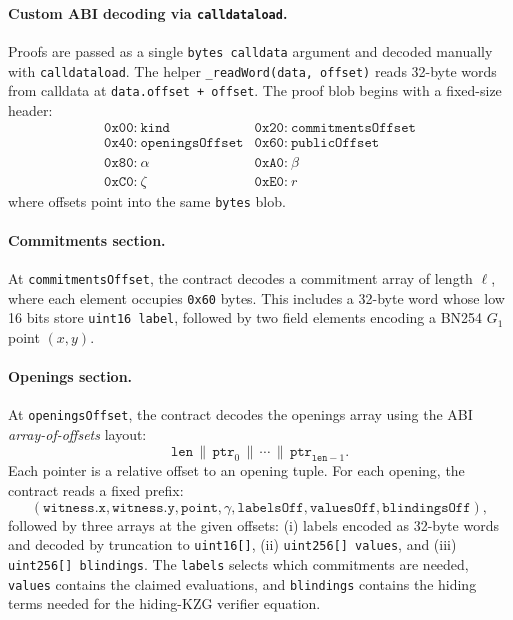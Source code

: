 \paragraph{Custom ABI decoding via \texttt{calldataload}.}
Proofs are passed as a single \texttt{bytes calldata} argument and decoded manually with \texttt{calldataload}.
The helper \texttt{\_readWord(data, offset)} reads 32-byte words from calldata at \texttt{data.offset + offset}.
The proof blob begins with a fixed-size header:
\[
\begin{array}{ll}
\texttt{0x00:}~\texttt{kind} &
\texttt{0x20:}~\texttt{commitmentsOffset} \\
\texttt{0x40:}~\texttt{openingsOffset} &
\texttt{0x60:}~\texttt{publicOffset} \\
\texttt{0x80:}~\alpha &
\texttt{0xA0:}~\beta \\
\texttt{0xC0:}~\zeta &
\texttt{0xE0:}~r
\end{array}
\]
where offsets point into the same \texttt{bytes} blob.
	
\paragraph{Commitments section.}
At \texttt{commitmentsOffset}, the contract decodes a commitment array of length $\ell$, where each element occupies \texttt{0x60} bytes.
This includes a 32-byte word whose low 16 bits store \texttt{uint16 label}, followed by two field elements encoding a BN254 $G_1$ point $(x,y)$.

\paragraph{Openings section.}
	At \texttt{openingsOffset}, the contract decodes the openings array using the ABI \emph{array-of-offsets} layout:
	\[
	\texttt{len} \,\|\, \texttt{ptr}_0 \,\|\, \cdots \,\|\, \texttt{ptr}_{\texttt{len}-1}.
	\]
	Each pointer is a relative offset to an opening tuple. For each opening, the contract reads a fixed prefix:
	\[
	(\texttt{witness.x}, \texttt{witness.y}, \texttt{point}, \gamma, \texttt{labelsOff}, \texttt{valuesOff}, \texttt{blindingsOff}),
	\]
followed by three arrays at the given offsets:
(i) labels encoded as 32-byte words and decoded by truncation to \texttt{uint16[]},
(ii) \texttt{uint256[] values}, and (iii) \texttt{uint256[] blindings}. 
The \texttt{labels} selects which commitments are needed, \texttt{values} contains the claimed evaluations, and \texttt{blindings} contains the hiding terms needed for the hiding-KZG verifier equation.
	
